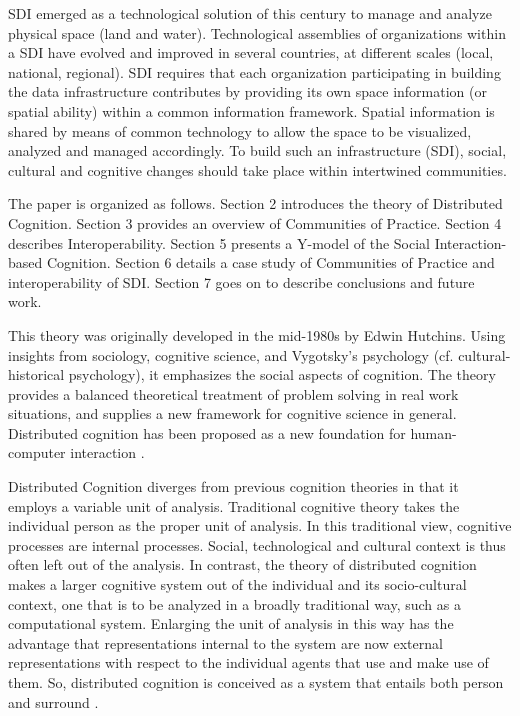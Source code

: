 \documentclass[10pt,twocolumn,ieeetran]{article}
\begin{document}
SDI emerged as a technological solution of this century to manage and analyze physical space (land and water). 
Technological assemblies of organizations within a SDI have evolved and improved in several countries, at different scales (local, national, regional). SDI requires that each organization participating in building the data infrastructure contributes by providing its own space information (or spatial ability) within a common information framework. Spatial information is shared by means of common technology to allow the space to be visualized, analyzed and managed accordingly. To build such an infrastructure (SDI), social, cultural \cite{Nisbett} and cognitive changes should take place within intertwined communities.



           
The paper is organized as follows. Section 2 introduces the theory of Distributed Cognition. 
Section 3 provides an overview of Communities of Practice. Section 4 describes Interoperability. Section 5 presents a Y-model of the Social Interaction-based Cognition. 
Section 6 details a case study of Communities of Practice and interoperability of SDI. 
Section 7 goes on to describe conclusions and future work.
                                       
                                                     

This theory was originally developed in the mid-1980s by Edwin Hutchins. Using insights from sociology, cognitive science, and Vygotsky's psychology  (cf. cultural-historical psychology), it emphasizes the social aspects of cognition. The theory provides a balanced theoretical treatment of problem solving in real work situations, and supplies a new framework for cognitive science in general.
Distributed cognition has been proposed as a new foundation for human-computer interaction \cite{Hollan}. 

Distributed Cognition diverges from previous cognition theories in that it employs a variable unit of analysis.  Traditional cognitive theory takes the individual person as the proper unit of analysis.  In this traditional view, cognitive processes are internal processes.  Social, technological and cultural context is thus often left out of the analysis. In contrast, the theory of distributed cognition makes a larger cognitive system out of the individual and its socio-cultural context, one that is to be analyzed in a broadly traditional way, such as a computational system. 
Enlarging the unit of analysis in this way has the advantage that representations internal to the system are now external representations with respect to the individual agents that use and make use of them. 
So, distributed cognition is conceived as a system that entails both person and surround \cite{Salomon}.
\end{document}
